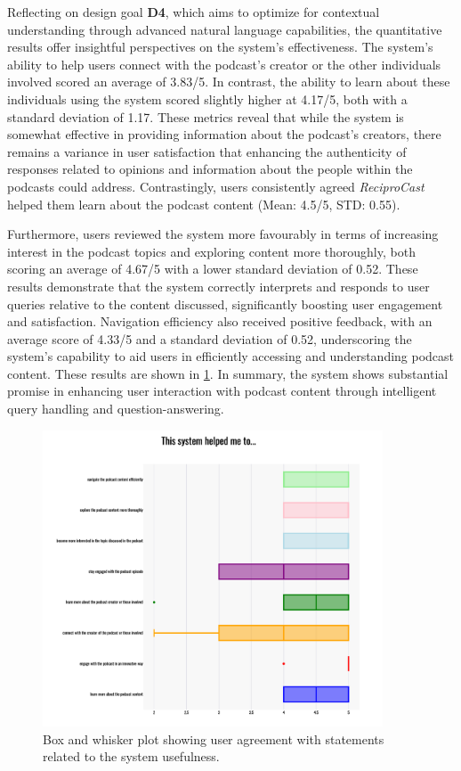 \documentclass[12pt]{report}
\begin{document}
\begin{myfont}
        \indent Reflecting on design goal \textbf{D4}, which aims to optimize for contextual understanding through advanced natural language capabilities, the quantitative results offer insightful perspectives on the system's effectiveness. The system's ability to help users connect with the podcast's creator or the other individuals involved scored an average of 3.83/5. In contrast, the ability to learn about these individuals using the system scored slightly higher at 4.17/5, both with a standard deviation of 1.17. These metrics reveal that while the system is somewhat effective in providing information about the podcast's creators, there remains a variance in user satisfaction that enhancing the authenticity of responses related to opinions and information about the people within the podcasts could address. Contrastingly, users consistently agreed \textit{ReciproCast} helped them learn about the podcast content (Mean: 4.5/5, STD: 0.55).

        \indent Furthermore, users reviewed the system more favourably in terms of increasing interest in the podcast topics and exploring content more thoroughly, both scoring an average of 4.67/5 with a lower standard deviation of 0.52. These results demonstrate that the system correctly interprets and responds to user queries relative to the content discussed, significantly boosting user engagement and satisfaction. Navigation efficiency also received positive feedback, with an average score of 4.33/5 and a standard deviation of 0.52, underscoring the system's capability to aid users in efficiently accessing and understanding podcast content. These results are shown in \ref{fig:helpeduser}. In summary, the system shows substantial promise in enhancing user interaction with podcast content through intelligent query handling and question-answering.

        \begin{figure}[H]
        \centering
          \includegraphics[width=0.9\textwidth]{figures/helpeduser.png}
          \caption{Box and whisker plot showing user agreement with statements related to the system usefulness.}
          \label{fig:helpeduser}
        \end{figure}


\end{myfont}
\end{document}
